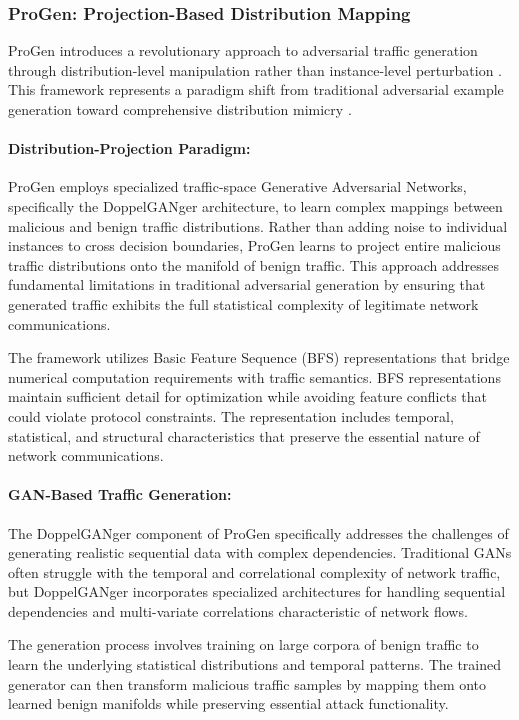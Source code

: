 \subsubsection{ProGen: Projection-Based Distribution Mapping}

ProGen introduces a revolutionary approach to adversarial traffic generation through distribution-level manipulation rather than instance-level perturbation \cite{progen2023projection}. This framework represents a paradigm shift from traditional adversarial example generation toward comprehensive distribution mimicry \cite{progen2023projection}.

\paragraph{Distribution-Projection Paradigm:}
ProGen employs specialized traffic-space Generative Adversarial Networks, specifically the DoppelGANger architecture, to learn complex mappings between malicious and benign traffic distributions. Rather than adding noise to individual instances to cross decision boundaries, ProGen learns to project entire malicious traffic distributions onto the manifold of benign traffic. This approach addresses fundamental limitations in traditional adversarial generation by ensuring that generated traffic exhibits the full statistical complexity of legitimate network communications.

The framework utilizes Basic Feature Sequence (BFS) representations that bridge numerical computation requirements with traffic semantics. BFS representations maintain sufficient detail for optimization while avoiding feature conflicts that could violate protocol constraints. The representation includes temporal, statistical, and structural characteristics that preserve the essential nature of network communications.

\paragraph{GAN-Based Traffic Generation:}
The DoppelGANger component of ProGen specifically addresses the challenges of generating realistic sequential data with complex dependencies. Traditional GANs often struggle with the temporal and correlational complexity of network traffic, but DoppelGANger incorporates specialized architectures for handling sequential dependencies and multi-variate correlations characteristic of network flows.

The generation process involves training on large corpora of benign traffic to learn the underlying statistical distributions and temporal patterns. The trained generator can then transform malicious traffic samples by mapping them onto learned benign manifolds while preserving essential attack functionality.

